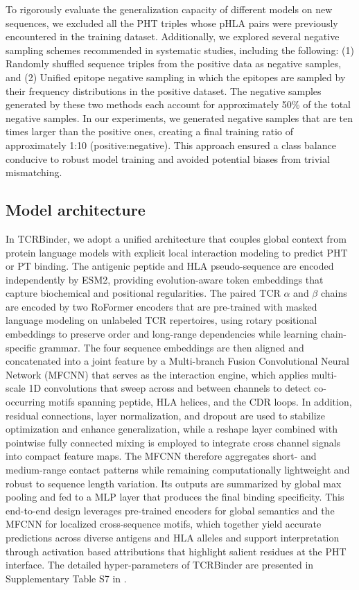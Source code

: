 \documentclass[10pt,letterpaper]{article}
\begin{document}
To rigorously evaluate the generalization capacity of different models on new sequences, we excluded all the PHT triples whose pHLA pairs were previously encountered in the training dataset. Additionally, we explored several negative sampling schemes recommended in systematic studies, including the following: (1) Randomly shuffled sequence triples from the positive data as negative samples, and (2) Unified epitope negative sampling in which the epitopes are sampled by their frequency distributions in the positive dataset. The negative samples generated by these two methods each account for approximately 50\% of the total negative samples. In our experiments, we generated negative samples that are ten times larger than the positive ones, creating a final training ratio of approximately 1:10 (positive:negative). This approach ensured a class balance conducive to robust model training and avoided potential biases from trivial mismatching. 

\subsection*{Model architecture}
In TCRBinder, we adopt a unified architecture that couples global context from protein language models with explicit local interaction modeling to predict PHT or PT binding. The antigenic peptide and HLA pseudo-sequence are encoded independently by ESM2, providing evolution-aware token embeddings that capture biochemical and positional regularities. The paired TCR $\alpha$ and $\beta$ chains are encoded by two RoFormer encoders that are pre-trained with masked language modeling on unlabeled TCR repertoires, using rotary positional embeddings to preserve order and long-range dependencies while learning chain-specific grammar. The four sequence embeddings are then aligned and concatenated into a joint feature by a Multi-branch Fusion Convolutional Neural Network (MFCNN) that serves as the interaction engine, which applies multi-scale 1D convolutions that sweep across and between channels to detect co-occurring motifs spanning peptide, HLA helices, and the CDR loops. In addition, residual connections, layer normalization, and dropout are used to stabilize optimization and enhance generalization, while a reshape layer combined with pointwise fully connected mixing is employed to integrate cross channel signals into compact feature maps. The MFCNN therefore aggregates short- and medium-range contact patterns while remaining computationally lightweight and robust to sequence length variation. Its outputs are summarized by global max pooling and fed to a MLP layer that produces the final binding specificity. This end-to-end design leverages pre-trained encoders for global semantics and the MFCNN for localized cross-sequence motifs, which together yield accurate predictions across diverse antigens and HLA alleles and support interpretation through activation based attributions that highlight salient residues at the PHT interface. The detailed hyper-parameters of TCRBinder are presented in Supplementary Table S7 in .
\end{document}
